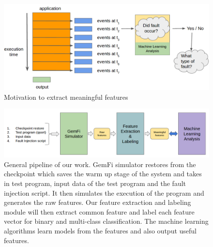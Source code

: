 \begin{figure}[t]
\begin{center}
   \includegraphics[width=0.95\linewidth]{./figures/teaser.png}
\end{center}
   \caption{\footnotesize Motivation to extract meaningful features}
\vspace{-0.5cm}
\label{fig:teaser}
\end{figure}

\begin{figure}[t]
\begin{center}
   \includegraphics[width=0.95\linewidth]{./figures/pipeline.png}
\end{center}
   \caption{\footnotesize General pipeline of our work. GemFi simulator restores from the checkpoint which saves the warm up stage of the system and takes in test program, input data of the test program and the fault injection script. It then simulates the execution of the program and generates the raw features. Our feature extraction and labeling module will then extract common feature and label each feature vector for binary and multi-class classification. The machine learning algorithms learn models from the features and also output useful features.}
\vspace{-0.3cm}
\label{fig:pipeline}
\end{figure}



